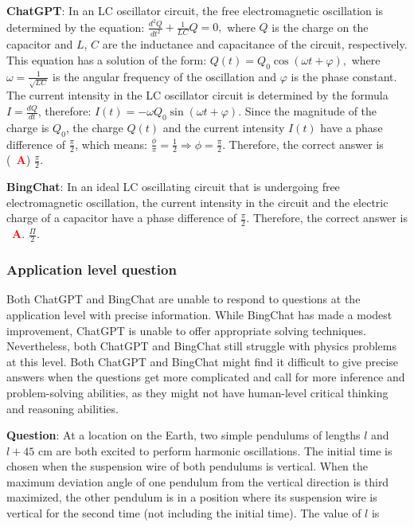 \documentclass{article}
\begin{document}
{\begin{mdframed}[linewidth=1pt,linecolor=red]
		\textbf{ChatGPT}: In an LC oscillator circuit, the free electromagnetic oscillation is determined by the equation: $\frac{d^2Q}{dt^2}+\frac{1}{LC}Q=0,$ where $Q$ is the charge on the capacitor and $L$, $C$ are the inductance and capacitance of the circuit, respectively. This equation has a solution of the form: $Q(t)=Q_0\cos(\omega t+\varphi),$ where $\omega=\frac{1}{\sqrt{LC}}$ is the angular frequency of the oscillation and $\varphi$ is the phase constant.
		The current intensity in the LC oscillator circuit is determined by the formula $I = \frac{dQ}{dt}$, therefore: $I(t)=-\omega Q_0\sin(\omega t+\varphi).$ Since the magnitude of the charge is $Q_0$, the charge $Q(t)$ and the current intensity $I(t)$ have a phase difference of $\frac{\pi}{2}$, which means: $\frac{\phi}{\pi} = \frac{1}{2} \Rightarrow \phi = \frac{\pi}{2}.$ Therefore, the correct answer is (~\textcolor{red}{\textbf{A}}) $\frac{\pi}{2}$.
		
		\textbf{BingChat}: In an ideal LC oscillating circuit that is undergoing free electromagnetic oscillation, the current intensity in the circuit and the electric charge of a capacitor have a phase difference of $\frac{\pi}{2}$. Therefore, the correct answer is ~\textcolor{red}{\textbf{A}}. $\frac{\Pi}{2}$.
		
	\end{mdframed}	
	
	\subsubsection{Application level question}
	\label{VNHSGE_Phy_A}
	
	Both ChatGPT and BingChat are unable to respond to questions at the application level with precise information. While BingChat has made a modest improvement, ChatGPT is unable to offer appropriate solving techniques. Nevertheless, both ChatGPT and BingChat still struggle with physics problems at this level. Both ChatGPT and BingChat might find it difficult to give precise answers when the questions get more complicated and call for more inference and problem-solving abilities, as they might not have human-level critical thinking and reasoning abilities.
	
	
	\begin{mdframed}[linewidth=1pt,linecolor=red] \textbf{Question}: At a location on the Earth, two simple pendulums of lengths $l$ and $l+45$ cm are both excited to perform harmonic oscillations. The initial time is chosen when the suspension wire of both pendulums is vertical. When the maximum deviation angle of one pendulum from the vertical direction is third maximized, the other pendulum is in a position where its suspension wire is vertical for the second time (not including the initial time). The value of $l$ is
		

\end{mdframed}}
\end{document}
